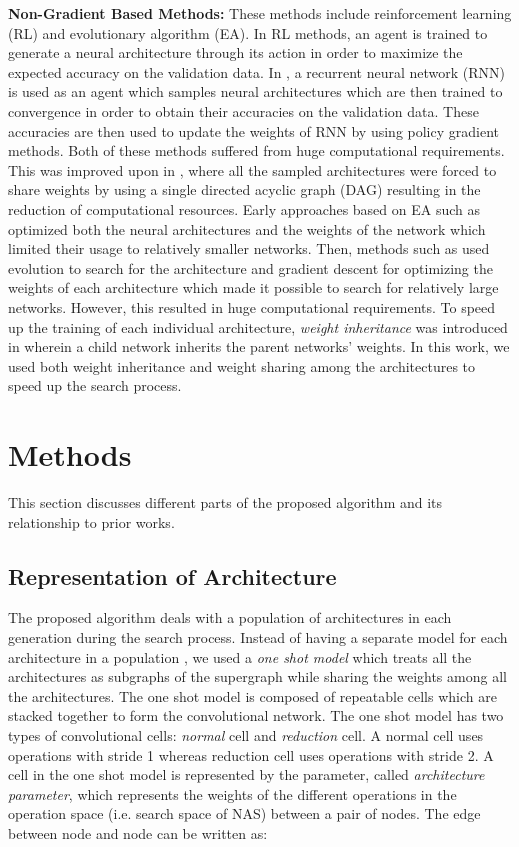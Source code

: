 \documentclass[final]{cvpr}
\begin{document}
\textbf{Non-Gradient Based Methods:} These methods include reinforcement learning (RL) and evolutionary algorithm (EA). In RL methods, an agent is trained to generate a neural architecture
through its action in order to maximize the expected accuracy on the validation data. In
\cite{zoph2016neural}\cite{zoph2018learning}, a recurrent neural network (RNN) is used as an agent
which samples neural architectures which are then trained to convergence in order to obtain their
accuracies on the validation data. These accuracies are then used to update the weights of RNN by
using policy gradient methods. Both of these methods suffered from huge computational requirements.
This was improved upon in \cite{pmlr-v80-pham18a}, where all the sampled architectures were forced
to share weights by using a single directed acyclic graph (DAG) resulting in the reduction of
computational resources. Early approaches based on EA such as
\cite{stanley2002evolving}\cite{stanley2009hypercube} optimized both the neural architectures and
the weights of the network which limited their usage to relatively smaller networks. Then, methods
such as \cite{xie2017genetic}\cite{real2019regularized} used evolution to search for the
architecture and gradient descent for optimizing the weights of each architecture which made it
possible to search for relatively large networks. However, this resulted in huge computational
requirements. To speed up the training of each individual architecture, \textit{weight inheritance}
was introduced in \cite{real2017large} wherein a child network inherits the parent networks'
weights. In this work, we used both weight inheritance and weight sharing among the architectures
to speed up the search process.

\section{Methods}
\label{methods}
This section discusses different parts of the proposed algorithm and its relationship to prior works.

\subsection{Representation of Architecture}
The proposed algorithm deals with a population of architectures in each generation during the 
search process. Instead of having a separate model for each architecture in a population
\cite{xie2017genetic}\cite{real2019regularized}, we used a \textit{one shot model} which
treats all the architectures as subgraphs of the supergraph while sharing the weights among
all the architectures. The one shot model is composed of repeatable cells which are stacked
together to form the convolutional network. The one shot model has two types of convolutional
cells: \textit{normal} cell and \textit{reduction} cell. A normal cell uses operations with
stride 1 whereas reduction cell uses operations with stride 2. A cell in the one shot model is
represented by the parameter,  called \textit{architecture parameter}, which
represents the weights of the different operations  in the operation space  (i.e.
search space of NAS) between a pair of nodes. The edge between node  and node
 can be written as:
    
\end{document}
